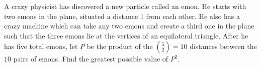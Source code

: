A crazy physicist has discovered a new particle called an emon. He starts with two emons in the plane, situated a distance $1$ from each other. He also has a crazy machine which can take any two emons and create a third one in the plane such that the three emons lie at the vertices of an equilateral triangle. After he has five total emons, let $P$ be the product of the $\binom 52 = 10$ distances between the $10$ pairs of emons. Find the greatest possible value of $P^2$.
